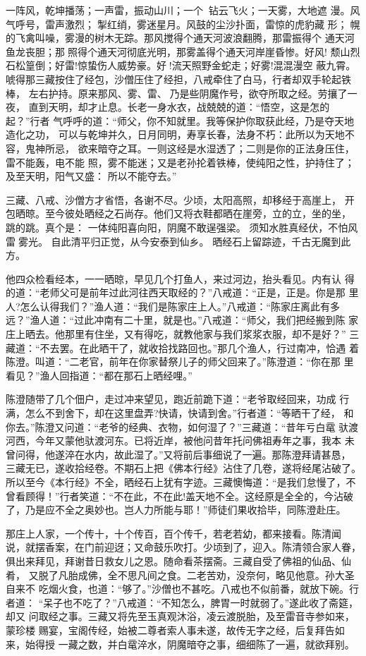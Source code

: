 一阵风，乾坤播荡；一声雷，振动山川；一个，钻云飞火；一天雾，大地遮
漫。风气呼号，雷声激烈；掣红绡，雾迷星月。风鼓的尘沙扑面，雷惊的虎豹藏
形；幌的飞禽叫噪，雾漫的树木无踪。那风搅得个通天河波浪翻腾，那雷振得个
通天河鱼龙丧胆；那照得个通天河彻底光明，那雾盖得个通天河岸崖昏惨。好风!
颓山烈石松篁倒；好雷!惊蛰伤人威势豪。好!流天照野金蛇走；好雾!混混漫空
蔽九霄。
唬得那三藏按住了经包，沙僧压住了经担，八戒牵住了白马，行者却双手轮起铁棒，
左右护持。原来那风、雾、雷、乃是些阴魔作号，欲夺所取之经。劳攘了一夜，
直到天明，却才止息。长老一身水衣，战兢兢的道：“悟空，这是怎的起？”行者
气呼呼的道：“师父，你不知就里。我等保护你取获此经，乃是夺天地造化之功，
可以与乾坤并久，日月同明，寿享长春，法身不朽：此所以为天地不容，鬼神所忌，
欲来暗夺之耳。一则这经是水湿透了；二则是你的正法身压住，雷不能轰，电不能
照，雾不能迷；又是老孙抡着铁棒，使纯阳之性，护持住了；及至天明，阳气又盛：
所以不能夺去。”

三藏、八戒、沙僧方才省悟，各谢不尽。少顷，太阳高照，却移经于高崖上，
开包晒晾。至今彼处晒经之石尚存。他们又将衣鞋都晒在崖旁，立的立，坐的坐，
跳的跳。真个是：
一体纯阳喜向阳，阴魔不敢逞强梁。
须知水胜真经伏，不怕风雷雾光。
自此清平归正觉，从今安泰到仙乡。
晒经石上留踪迹，千古无魔到此方。

他四众检看经本，一一晒晾，早见几个打鱼人，来过河边，抬头看见。内有认
得的道：“老师父可是前年过此河往西天取经的？”八戒道：“正是，正是。你是那
里人?怎么认得我们？”渔人道：“我们是陈家庄上人。”八戒道：“陈家庄离此有多
远？”渔人道：“过此冲南有二十里，就是也。”八戒道：“师父，我们把经搬到陈
家庄上晒去。他那里有住坐，又有得吃，就教他家与我们浆浆衣服，却不是好？”
三藏道：“不去罢。在此晒干了，就收拾找路回也。”那几个渔人，行过南冲，恰遇
着陈澄。叫道：“二老官，前年在你家替祭儿子的师父回来了。”陈澄道：“你在那
里看见？”渔人回指道：“都在那石上晒经哩。”

陈澄随带了几个佃户，走过冲来望见，跑近前跪下道：“老爷取经回来，功成
行满，怎么不到舍下，却在这里盘弄?快请，快请到舍。”行者道：“等晒干了经，
和你去。”陈澄又问道：“老爷的经典、衣物，如何湿了？”三藏道：“昔年亏白鼋
驮渡河西，今年又蒙他驮渡河东。已将近岸，被他问昔年托问佛祖寿年之事，我本
未曾问得，他遂淬在水内，故此湿了。”又将前后事细说了一遍。那陈澄拜请甚恳，
三藏无已，遂收拾经卷。不期石上把《佛本行经》沾住了几卷，遂将经尾沾破了。
所以至今《本行经》不全，晒经石上犹有字迹。三藏懊悔道：“是我们怠慢了，不
曾看顾得！”行者笑道：“不在此，不在此!盖天地不全。这经原是全全的，今沾破
了，乃是应不全之奥妙也。岂人力所能与耶！”师徒们果收拾毕，同陈澄赴庄。

那庄上人家，一个传十，十个传百，百个传千，若老若幼，都来接看。陈清闻
说，就摆香案，在门前迎迓；又命鼓乐吹打。少顷到了，迎入。陈清领合家人眷，
俱出来拜见，拜谢昔日救女儿之恩。随命看茶摆斋。三藏自受了佛祖的仙品、仙肴，
又脱了凡胎成佛，全不思凡间之食。二老苦劝，没奈何，略见他意。孙大圣自来不
吃烟火食，也道：“够了。”沙僧也不甚吃。八戒也不似前番，就放下碗。行者道：
“呆子也不吃了？”八戒道：“不知怎么，脾胃一时就弱了。”遂此收了斋筵，却又
问取经之事。三藏又将先至玉真观沐浴，凌云渡脱胎，及至雷音寺参如来，蒙珍楼
赐宴，宝阁传经，始被二尊者索人事未遂，故传无字之经，后复拜告如来，始得授
一藏之数，并白鼋淬水，阴魔暗夺之事，细细陈了一遍，就欲拜别。

